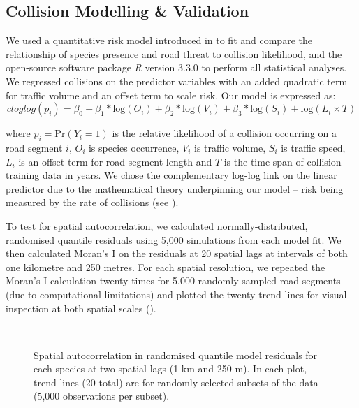 \subsection{Collision Modelling \& Validation}

We used a quantitative risk model introduced in  to fit and compare the relationship of species presence and road threat to collision likelihood, and the open-source software package \textit{R} version 3.3.0 \citep{rdct16} to perform all statistical analyses. We regressed collisions on the predictor variables with an added quadratic term for traffic volume and an offset term to scale risk. Our model is expressed as:
\begin{equation} \label{eq:41}
cloglog(p_i) = \beta_0 + \beta_1*\text{log}(O_i) + \beta_2*\text{log}(V_i) + \beta_3*\text{log}(S_i) + \text{log}(L_i \times T)
\end{equation}

\noindent where $p_i=\text{Pr}(Y_i=1)$ is the relative likelihood of a collision occurring on a road segment $i$, $O_i$ is species occurrence, $V_i$ is traffic volume, $S_i$ is traffic speed, $L_i$ is an offset term for road segment length and $T$ is the time span of collision training data in years. We chose the complementary log-log link on the linear predictor due to the mathematical theory underpinning our model -- risk being measured by the rate of collisions (see ).

To test for spatial autocorrelation, we calculated normally-distributed, randomised quantile residuals \citep[see][]{dunn96} using 5,000 simulations from each model fit. We then calculated Moran's I on the residuals at 20 spatial lags at intervals of both one kilometre and 250 metres.  For each spatial resolution, we repeated the Moran's I calculation twenty times for 5,000 randomly sampled road segments (due to computational limitations) and plotted the twenty trend lines for visual inspection at both spatial scales ().

\begin{figure*}[!h]
  \captionsetup[subfloat]{farskip=-2pt,nearskip=-2pt}
  \centering
  \\
  \caption[Spatial autocorrelation in randomised quantile model residuals for kangaroos and deer]{Spatial autocorrelation in randomised quantile model residuals for each species at two spatial lags (1-km and 250-m).  In each plot, trend lines (20 total) are for randomly selected subsets of the data (5,000 observations per subset).}
  \label{cal_sac}
\end{figure*}

